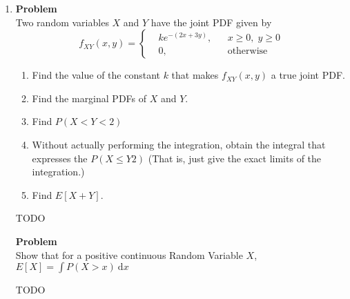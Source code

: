 \documentclass[12pt]{article}
\newenvironment{Ex}{\textbf{Problem}\vspace{.75em}\\}{}
\newcommand{\dd}[1]{\:\mathrm{d}{#1}}
\begin{document}
\begin{enumerate}
\begin{Ex}
\begin{enumerate}
    \end{enumerate}
    \begin{solution} \hfill
      {\huge TODO}
    \end{solution}
  \end{Ex}
  \begin{Ex}
    A random variable $X$ is uniformly distributed between 0 and
    10. Find the probability that $X$ lies between a standard deviation
   $\sigma X$ from its mean $\mu X$.
    \begin{solution} \hfill
      {\huge TODO}
    \end{solution}
  \end{Ex}
\item 
  \begin{Ex}
    Two random variables $X$ and $Y$ have the joint PDF given by
    \begin{equation}
      \label{eq:6-question}
      f_{XY}(x,y) = \left\{
        \begin{aligned}
          & ke^{-(2x+3y)}, && x \ge 0,\; y \ge 0 \\
          & 0, && \text{otherwise}
        \end{aligned} \right.
      \end{equation}
      \begin{enumerate}
      \item Find the value of the constant $k$ that makes $f_{XY}(x,
        y)$ a true joint PDF.
      \item Find the marginal PDFs of $X$ and $Y$.
      \item Find $P(X<Y<2)$
      \item Without actually performing the integration, obtain the
        integral that expresses the $P(X \le Y2)$ (That is, just give
        the exact limits of the integration.)
      \item Find $E[X +Y]$.
      \end{enumerate}
      \begin{solution} \hfill
        {\huge TODO}
    \end{solution}
  \end{Ex}
  \begin{Ex}
    Show that for a positive continuous Random Variable $X$, $E[X] =
    \int P(X > x) \dd{x}$
    \begin{solution} \hfill
      {\huge TODO}
    \end{solution}
  \end{Ex}
\end{enumerate}
\end{document}
